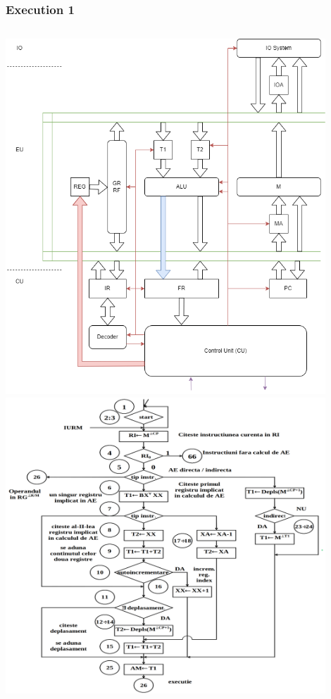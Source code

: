\begin{frame}
\frametitle{Execution 1}
\begin{columns}
\includegraphics[width=0.9\textwidth]{media/architecture.png}
\includegraphics[width=0.9\textwidth]{media/cdtree1.png}
\end{columns}
\end{frame}

